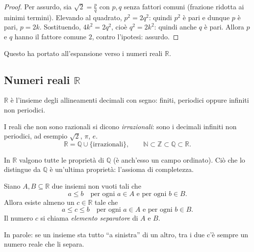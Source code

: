 \documentclass[11pt,a4paper]{article}
\theoremstyle{definition}
\begin{document}
\begin{proof}
Per assurdo, sia $\sqrt{2} = \frac{p}{q}$ con $p, q$ senza fattori comuni
(frazione ridotta ai minimi termini). Elevando al quadrato,
$p^2 = 2q^2$: quindi $p^2$ è pari e dunque $p$ è pari, $p = 2k$.
Sostituendo, $4k^2 = 2q^2$, cioè $q^2 = 2k^2$: quindi anche $q$ è pari.
Allora $p$ e $q$ hanno il fattore comune $2$, contro l'ipotesi: assurdo.
\end{proof}

Questo ha portato all'espansione verso i numeri reali $\mathbb{R}$.


\subsection{Numeri reali $\mathbb{R}$}

\begin{definizione}
$\mathbb{R}$ è l'insieme degli allineamenti decimali con segno:
finiti, periodici oppure infiniti non periodici.
\end{definizione}

I reali che non sono razionali si dicono \emph{irrazionali}: sono i
decimali infiniti non periodici, ad esempio $\sqrt{2}$, $\pi$, $e$.
\[
\mathbb{R} = \mathbb{Q} \cup \{\text{irrazionali}\}, \qquad
\mathbb{N} \subset \mathbb{Z} \subset \mathbb{Q} \subset \mathbb{R}.
\]

In $\mathbb{R}$ valgono tutte le proprietà di $\mathbb{Q}$ (è anch'esso un
campo ordinato). Ciò che lo distingue da $\mathbb{Q}$ è un'ultima
proprietà: l'assioma di completezza.

\begin{assioma}
Siano $A, B \subseteq \mathbb{R}$ due insiemi non vuoti tali che
\[
a \leq b \quad \text{per ogni } a \in A \text{ e per ogni } b \in B.
\]
Allora esiste almeno un $c \in \mathbb{R}$ tale che
\[
a \leq c \leq b \quad \text{per ogni } a \in A \text{ e per ogni } b \in B.
\]
Il numero $c$ si chiama \emph{elemento separatore} di $A$ e $B$.
\end{assioma}

In parole: se un insieme sta tutto ``a sinistra'' di un altro, tra i due
c'è sempre un numero reale che li separa.

\begin{center}
\end{center}
\end{document}

